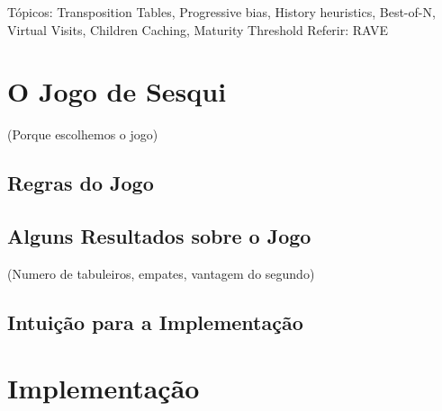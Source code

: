 \documentclass[12pt,a4paper,oneside]{article}
\begin{document}
Tópicos: Transposition Tables, Progressive bias, History heuristics, Best-of-N, Virtual Visits, Children Caching, Maturity Threshold
Referir: RAVE

\lipsum[1]

\lipsum[2]

\lipsum[3]

\lipsum[4]

\lipsum[5]



\section{O Jogo de Sesqui}
\label{sec:sesqui}

(Porque escolhemos o jogo)

\lipsum[1]

\subsection{Regras do Jogo}

\lipsum[1]

\lipsum[2]

\lipsum[3]

\subsection{Alguns Resultados sobre o Jogo}

(Numero de tabuleiros, empates, vantagem do segundo)

\lipsum[1]

\lipsum[2]

\subsection{Intuição para a Implementação}

\lipsum[1]

\lipsum[2]


\section{Implementação}
\label{sec:imp}
\end{document}
